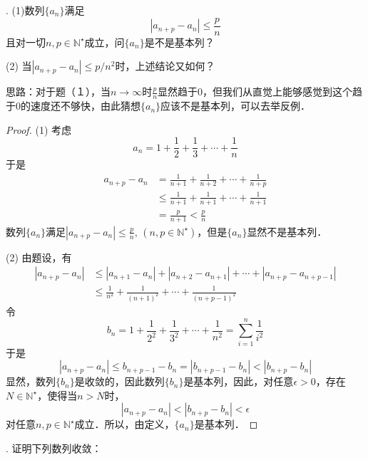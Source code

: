 . (1)数列$\{a_n\}$满足
\begin{equation}
    |a_{n+p}-a_n|\leq\frac{p}{n}
\end{equation}
且对一切$n,p\in\mathbb{N}^\star$成立，问$\{ a_n\}$是不是基本列？

\noindent (2) 当$|a_{n+p} - a_n| \leq p/n^2$时，上述结论又如何？

\noindent 思路：对于题（１），当$n\to\infty$时$\displaystyle\frac{p}{n}$显然趋于$0$，但我们从直觉上能够感觉到这个趋于$0$的速度还不够快，由此猜想$\{a_n\}$应该不是基本列，可以去举反例．
\begin{proof}
(1) 考虑
\begin{equation}
    a_n = 1 + \frac{1}{2} + \frac{1}{3} + \cdots + \frac{1}{n} 
\end{equation}
于是
\begin{align}
    a_{n+p} - a_n &= \frac{1}{n+1} + \frac{1}{n+2} + \cdots + \frac{1}{n+p}\\
    &\leq \frac{1}{n+1} + \frac{1}{n+1} + \cdots + \frac{1}{n+1} \\
    &= \frac{p}{n+1} < \frac{p}{n}
\end{align}
数列$\{a_n\}$满足$|a_{n+p}-a_n|\leq \displaystyle\frac{p}{n}, \, (n,p\in\mathbb{N}^\star)$，但是$\{a_n\}$显然不是基本列．

\noindent (2) 由题设，有
\begin{align}
    |a_{n+p} - a_n| &\leq |a_{n+1} - a_n| + |a_{n+2} - a_{n+1}| + \cdots + |a_{n+p} - a_{n+p-1}| \\
    &\leq \frac{1}{n^2} + \frac{1}{(n+1)^2} + \cdots + \frac{1}{(n+p-1)^2}
\end{align}
令
\begin{equation}
    b_n = 1 + \frac{1}{2^2} + \frac{1}{3^2} + \cdots + \frac{1}{n^2} = \sum_{i=1}^n \frac{1}{i^2}
\end{equation}
于是
\begin{equation}
    |a_{n+p} - a_n| \leq b_{n+p-1} - b_n = |b_{n+p-1} - b_n| < |b_{n+p} - b_n|
\end{equation}
显然，数列$\{b_n\}$是收敛的，因此数列$\{ b_n \}$是基本列，因此，对任意$\epsilon > 0$，存在$N \in \mathbb{N}^\star$，使得当$n > N$时，
\begin{equation}
    |a_{n+p} - a_n| < |b_{n+p} - b_n| < \epsilon
\end{equation}
对任意$n, p \in \mathbb{N}^\star$成立．所以，由定义，$\{ a_n \}$是基本列．
\end{proof}

. 证明下列数列收敛：

